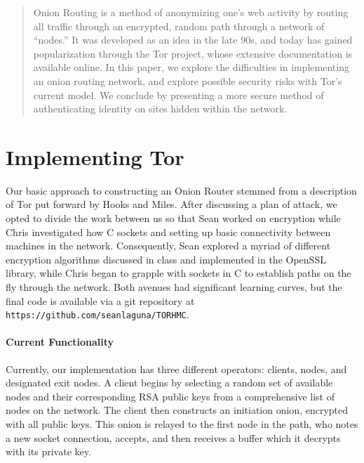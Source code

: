 \documentclass[12pt]{article}
\begin{document}
\maketitle

\begin{abstract}
Onion Routing is a method of anonymizing one's web activity by routing all traffic through an encrypted, random path through a network of ``nodes.'' It was developed as an idea in the late 90s\cite{gold}, and today has gained popularization through the Tor project, whose extensive documentation is available online\cite{tor}. In this paper, we explore the difficulties in implementing an onion routing network, and explore possible security risks with Tor's current model. We conclude by presenting a more secure method of authenticating identity on sites hidden within the network.
\end{abstract}

\section{Implementing Tor}
Our basic approach to constructing an Onion Router stemmed from a description of Tor put forward by Hooks and Miles\cite{hook}. After discussing a plan of attack, we opted to divide the work between us so that Sean worked on encryption while Chris investigated how C sockets and setting up basic connectivity between machines in the network. Consequently, Sean explored a myriad of different encryption algorithms discussed in class and implemented in the OpenSSL library, while Chris began to grapple with sockets in C to establish paths on the fly through the network. Both avenues had significant learning curves, but the final code is available via a git repository at {\tt https://github.com/seanlaguna/TORHMC}.

\paragraph{Current Functionality}
Currently, our implementation has three different operators: clients, nodes, and designated exit nodes. A client begins by selecting a random set of available nodes and their corresponding RSA public keys from a comprehensive list of nodes on the network. The client then constructs an initiation onion, encrypted with all public keys. This onion is relayed to the first node in the path, who notes a new socket connection, accepts, and then receives a buffer which it decrypts with its private key.
\end{document}
